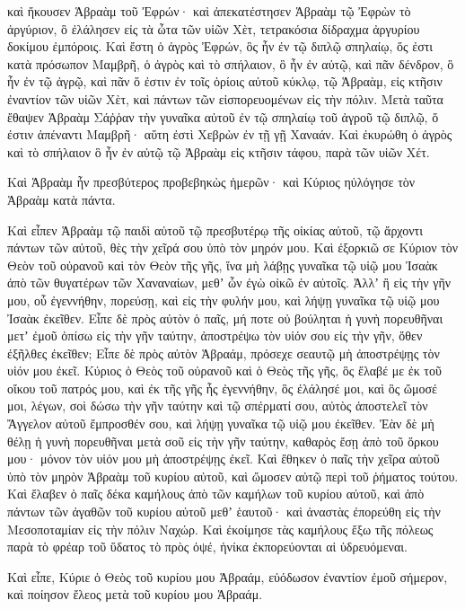 {καὶ ἤκουσεν Ἁβραὰμ τοῦ Ἐφρών· καὶ ἀπεκατέστησεν Ἁβραὰμ τῷ Ἐφρὼν τὸ ἀργύριον, ὃ ἐλάλησεν εἰς τὰ ὦτα τῶν υἱῶν Χὲτ, τετρακόσια δίδραχμα ἀργυρίου δοκίμου ἐμπόροις.
Καὶ ἔστη ὁ ἀγρὸς Ἐφρών, ὃς ἦν ἐν τῷ διπλῷ σπηλαίῳ, ὅς ἐστι κατὰ πρόσωπον Μαμβρῆ, ὁ ἀγρὸς καὶ τὸ σπήλαιον, ὃ ἦν ἐν αὐτῷ, καὶ πᾶν δένδρον, ὃ ἦν ἐν τῷ ἀγρῷ, καὶ πᾶν ὅ ἐστιν ἐν τοῖς ὁρίοις αὐτοῦ κύκλῳ,
τῷ Ἁβραὰμ, εἰς κτῆσιν ἐναντίον τῶν υἱῶν Χὲτ, καὶ πάντων τῶν εἰσπορευομένων εἰς τὴν πόλιν.
Μετὰ ταῦτα ἔθαψεν Ἁβραὰμ Σάῤῥαν τὴν γυναῖκα αὐτοῦ ἐν τῷ σπηλαίῳ τοῦ ἀγροῦ τῷ διπλῷ, ὅ ἐστιν ἀπέναντι Μαμβρῆ· αὕτη ἐστὶ Χεβρὼν ἐν τῇ γῇ Χαναάν.
Καὶ ἐκυρώθη ὁ ἀγρὸς καὶ τὸ σπήλαιον ὃ ἦν ἐν αὐτῷ τῷ Ἁβραὰμ εἰς κτῆσιν τάφου, παρὰ τῶν υἱῶν Χέτ.

Καὶ Ἁβραὰμ ἦν πρεσβύτερος προβεβηκὼς ἡμερῶν· καὶ Κύριος ηὐλόγησε τὸν Ἁβραὰμ κατὰ πάντα.
\par }{\PP {}Καὶ εἶπεν Ἁβραὰμ τῷ παιδὶ αὐτοῦ τῷ πρεσβυτέρῳ τῆς οἰκίας αὐτοῦ, τῷ ἄρχοντι πάντων τῶν αὐτοῦ, θὲς τὴν χεῖρά σου ὑπὸ τὸν μηρόν μου.
Καὶ ἐξορκιῶ σε Κύριον τὸν Θεὸν τοῦ οὐρανοῦ καὶ τὸν Θεὸν τῆς γῆς, ἵνα μὴ λάβῃς γυναῖκα τῷ υἱῷ μου Ἰσαὰκ ἀπὸ τῶν θυγατέρων τῶν Χαναναίων, μεθʼ ὧν ἐγὼ οἰκῶ ἐν αὐτοῖς.
Ἀλλʼ ἢ εἰς τὴν γῆν μου, οὗ ἐγεννήθην, πορεύσῃ, καὶ εἰς τὴν φυλήν μου, καὶ λήψῃ γυναῖκα τῷ υἱῷ μου Ἰσαὰκ ἐκεῖθεν.
Εἶπε δὲ πρὸς αὐτὸν ὁ παῖς, μή ποτε οὐ βούληται ἡ γυνὴ πορευθῆναι μετʼ ἐμοῦ ὀπίσω εἰς τὴν γῆν ταύτην, ἀποστρέψω τὸν υἱόν σου εἰς τὴν γῆν, ὅθεν ἐξῆλθες ἐκεῖθεν;
Εἶπε δὲ πρὸς αὐτὸν Ἁβραάμ, πρόσεχε σεαυτῷ μὴ ἀποστρέψῃς τὸν υἱόν μου ἐκεῖ.
Κύριος ὁ Θεὸς τοῦ οὐρανοῦ καὶ ὁ Θεὸς τῆς γῆς, ὃς ἔλαβέ με ἐκ τοῦ οἴκου τοῦ πατρός μου, καὶ ἐκ τῆς γῆς ἧς ἐγεννήθην, ὃς ἐλάλησέ μοι, καὶ ὃς ὤμοσέ μοι, λέγων, σοὶ δώσω τὴν γῆν ταύτην καὶ τῷ σπέρματί σου, αὐτὸς ἀποστελεῖ τὸν Ἄγγελον αὐτοῦ ἔμπροσθέν σου, καὶ λήψῃ γυναῖκα τῷ υἱῷ μου ἐκεῖθεν.
Ἐὰν δὲ μὴ θέλῃ ἡ γυνὴ πορευθῆναι μετὰ σοῦ εἰς τὴν γῆν ταύτην, καθαρὸς ἔσῃ ἀπὸ τοῦ ὅρκου μου· μόνον τὸν υἱόν μου μὴ ἀποστρέψῃς ἐκεῖ.
Καὶ ἔθηκεν ὁ παῖς τὴν χεῖρα αὐτοῦ ὑπὸ τὸν μηρὸν Ἁβραὰμ τοῦ κυρίου αὐτοῦ, καὶ ὤμοσεν αὐτῷ περὶ τοῦ ῥήματος τούτου.
Καὶ ἔλαβεν ὁ παῖς δέκα καμήλους ἀπὸ τῶν καμήλων τοῦ κυρίου αὐτοῦ, καὶ ἀπὸ πάντων τῶν ἀγαθῶν τοῦ κυρίου αὐτοῦ μεθʼ ἑαυτοῦ· καὶ ἀναστὰς ἐπορεύθη εἰς τὴν Μεσοποταμίαν εἰς τὴν πόλιν Ναχώρ.
Καὶ ἐκοίμησε τὰς καμήλους ἔξω τῆς πόλεως παρὰ τὸ φρέαρ τοῦ ὕδατος τὸ πρὸς ὀψέ, ἡνίκα ἐκπορεύονται αἱ ὑδρευόμεναι.
\par }{\PP {}Καὶ εἶπε, Κύριε ὁ Θεὸς τοῦ κυρίου μου Ἁβραάμ, εὐόδωσον ἐναντίον ἐμοῦ σήμερον, καὶ ποίησον ἔλεος μετὰ τοῦ κυρίου μου Ἁβραάμ.
}
